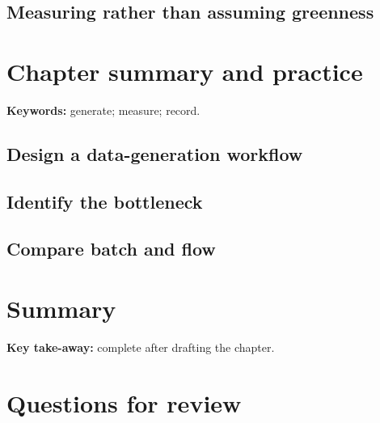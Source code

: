\subsection{Measuring rather than assuming greenness}


\section{Chapter summary and practice}

\begin{notebox}
\textbf{Keywords:} generate; measure; record.
\end{notebox}

\subsection{Design a data-generation workflow}


\subsection{Identify the bottleneck}


\subsection{Compare batch and flow}


\section{Summary}

\begin{notebox}
\textbf{Key take-away:} complete after drafting the chapter.
\end{notebox}

\section{Questions for review}

\solution{4cm}{%
}
